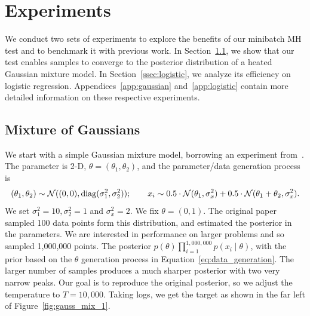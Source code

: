 \documentclass{article}
\begin{document}
\section{Experiments}\label{sec:experiments}

We conduct two sets of experiments to explore the benefits of our minibatch MH
test and to benchmark it with previous work. In Section~\ref{ssec:gaussians}, we
show that our test enables samples to converge to the posterior distribution of
a heated Gaussian mixture model. In Section~\ref{ssec:logistic}, we analyze its
efficiency on logistic regression.  Appendices~\ref{app:gaussian}
and~\ref{app:logistic} contain more detailed information on these respective
experiments.

\subsection{Mixture of Gaussians}\label{ssec:gaussians}

We start with a simple Gaussian mixture model, borrowing an experiment
from~\cite{langevin_2011}.  The parameter is 2-D, $\theta =
(\theta_1,\theta_2)$, and the parameter/data generation process is
\begin{equation}\label{eq:data_generation}
    (\theta_1,\theta_2) \sim \mathcal{N}((0,0), {\rm diag}(\sigma_1^2, \sigma_2^2));\quad \quad x_i \sim
    0.5 \cdot \mathcal{N}(\theta_1, \sigma_x^2) + 0.5 \cdot \mathcal{N}(\theta_1+\theta_2, \sigma_x^2).
\end{equation}
We set $\sigma_1^2 = 10, \sigma_2^2 = 1$ and $\sigma_x^2=2$.  We fix $\theta =
(0,1)$. The original paper sampled 100 data points form this distribution,
and estimated the posterior in the parameters. We are interested in performance
on larger problems and so sampled 1,000,000 points. The posterior
$p(\theta)\prod_{i=1}^{1,000,000}p(x_i\mid \theta)$, with the prior based on the
$\theta$ generation process in Equation~\ref{eq:data_generation}. The larger
number of samples produces a much sharper posterior with two very narrow peaks.
Our goal is to reproduce the original posterior, so we adjust the temperature
to $T=10,000$. Taking logs, we
get the target as shown in the far left of Figure~\ref{fig:gauss_mix_1}.
\end{document}
